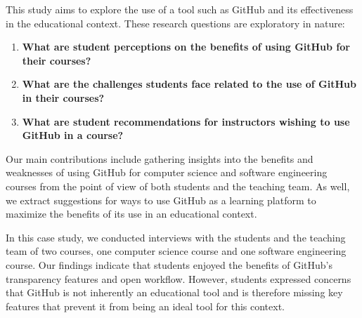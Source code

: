 
This study aims to explore the use of a tool such as GitHub and its effectiveness in the educational context. These research questions are exploratory in nature:
\begin{enumerate}
\item \textbf{What are student perceptions on the benefits of using GitHub for their courses?}
\item \textbf{What are the challenges students face related to the use of GitHub in their courses?}
\item \textbf{What are student recommendations for instructors wishing to use GitHub in a course?}
\end{enumerate}

Our main contributions include gathering insights into the benefits and weaknesses of using GitHub for computer science and software engineering courses from the point of view of both students and the teaching team. As well, we extract suggestions for ways to use GitHub as a learning platform to maximize the benefits of its use in an educational context.

In this case study, we conducted interviews with the students and the teaching team of two courses, one computer science course and one software engineering course. Our findings indicate that students enjoyed the benefits of GitHub's transparency features and open workflow. However, students expressed concerns that GitHub is not inherently an educational tool and is therefore missing key features that prevent it from being an ideal tool for this context.



